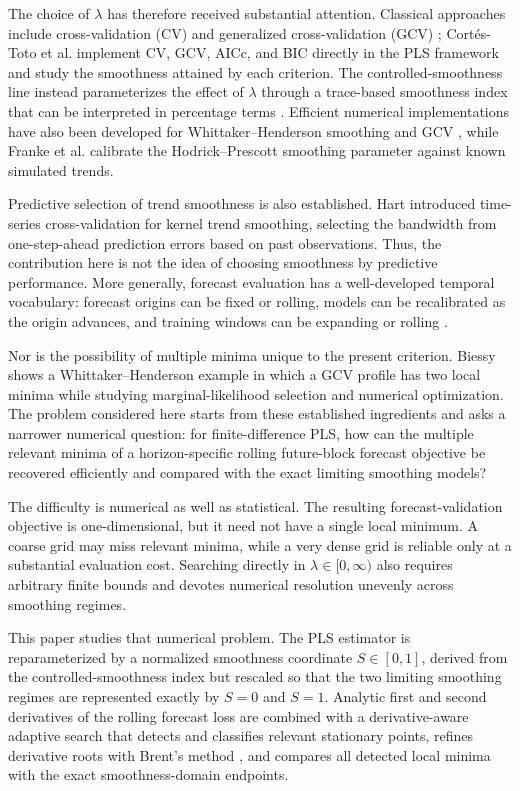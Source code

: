 \documentclass[english]{smcca}
\begin{document}
The choice of \(\lambda\) has therefore received substantial attention. Classical approaches include cross-validation (CV) and generalized cross-validation (GCV) \cite{craven1979gcv}; Cortés-Toto et al. \cite{cortes2017smoothness} implement CV, GCV, AICc, and BIC directly in the PLS framework and study the smoothness attained by each criterion. The controlled-smoothness line instead parameterizes the effect of \(\lambda\) through a trace-based smoothness index that can be interpreted in percentage terms \cite{guerrero2008smoothness,cortes2017smoothness}. Efficient numerical implementations have also been developed for Whittaker--Henderson smoothing and GCV \cite{weinert2007wh}, while Franke et al. \cite{franke2026hp} calibrate the Hodrick--Prescott smoothing parameter against known simulated trends.

Predictive selection of trend smoothness is also established. Hart \cite{hart1994tscv} introduced time-series cross-validation for kernel trend smoothing, selecting the bandwidth from one-step-ahead prediction errors based on past observations. Thus, the contribution here is not the idea of choosing smoothness by predictive performance. More generally, forecast evaluation has a well-developed temporal vocabulary: forecast origins can be fixed or rolling, models can be recalibrated as the origin advances, and training windows can be expanding or rolling \cite{tashman2000oos,bergmeir2012cv}.

Nor is the possibility of multiple minima unique to the present criterion. Biessy \cite{biessy2026wh} shows a Whittaker--Henderson example in which a GCV profile has two local minima while studying marginal-likelihood selection and numerical optimization. The problem considered here starts from these established ingredients and asks a narrower numerical question: for finite-difference PLS, how can the multiple relevant minima of a horizon-specific rolling future-block forecast objective be recovered efficiently and compared with the exact limiting smoothing models?

The difficulty is numerical as well as statistical. The resulting forecast-validation objective is one-dimensional, but it need not have a single local minimum. A coarse grid may miss relevant minima, while a very dense grid is reliable only at a substantial evaluation cost. Searching directly in \(\lambda\in[0,\infty)\) also requires arbitrary finite bounds and devotes numerical resolution unevenly across smoothing regimes.

This paper studies that numerical problem. The PLS estimator is reparameterized by a normalized smoothness coordinate \(S\in[0,1]\), derived from the controlled-smoothness index but rescaled so that the two limiting smoothing regimes are represented exactly by \(S=0\) and \(S=1\). Analytic first and second derivatives of the rolling forecast loss are combined with a derivative-aware adaptive search that detects and classifies relevant stationary points, refines derivative roots with Brent's method \cite{brent1971zero}, and compares all detected local minima with the exact smoothness-domain endpoints.
\end{document}
